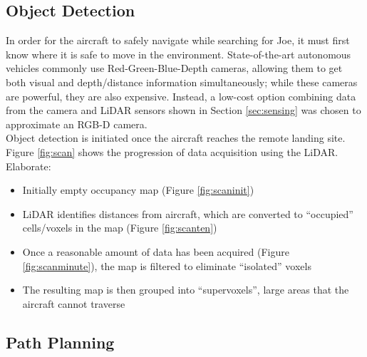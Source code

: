 
\subsection{Object Detection}
In order for the aircraft to safely navigate while searching for Joe, it must first know where it is safe to move in the environment. State-of-the-art autonomous vehicles commonly use Red-Green-Blue-Depth cameras, allowing them to get both visual and depth/distance information simultaneously; while these cameras are powerful, they are also expensive. Instead, a low-cost option combining data from the camera and LiDAR sensors shown in Section \ref{sec:sensing} was chosen to approximate an RGB-D camera.\\

Object detection is initiated once the aircraft reaches the remote landing site. Figure \ref{fig:scan} shows the progression of data acquisition using the LiDAR.\\

Elaborate:
\begin{itemize}
	\item Initially empty occupancy map (Figure \ref{fig:scaninit})
	\item LiDAR identifies distances from aircraft, which are converted to ``occupied'' cells/voxels in the map (Figure \ref{fig:scanten})
	\item Once a reasonable amount of data has been acquired (Figure \ref{fig:scanminute}), the map is filtered to eliminate ``isolated'' voxels
	\item The resulting map is then grouped into ``supervoxels'', large areas that the aircraft cannot traverse
\end{itemize}

\subsection{Path Planning}


